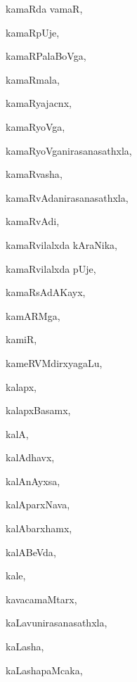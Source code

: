\begin{multicols}{3}
{\noindent
{kamaRda vamaR}, \pageref{kamaRda vamaR}

\noindent
{kamaRpUje}, \pageref{kamaRpUje}

\noindent
{kamaRPalaBoVga}, \pageref{kamaRPalaBoVga}

\noindent
{kamaRmala}, \pageref{kamaRmala}

\noindent
{kamaRyajacnx}, \pageref{kamaRyajacnx}

\noindent
{kamaRyoVga}, \pageref{kamaRyoVga}

\noindent
{kamaRyoVganirasanasathxla}, \pageref{kamaRyoVganirasanasathxla}

\noindent
{kamaRvasha}, \pageref{kamaRvasha}

\noindent
{kamaRvAdanirasanasathxla}, \pageref{kamaRvAdanirasanasathxla}

\noindent
{kamaRvAdi}, \pageref{kamaRvAdi}

\noindent
{kamaRvilalxda kAraNika}, \pageref{kamaRvilalxda kAraNika}

\noindent
{kamaRvilalxda pUje}, \pageref{kamaRvilalxda pUje}

\noindent
{kamaRsAdAKayx}, \pageref{kamaRsAdAKayx}

\noindent
{kamARMga}, \pageref{kamARMga}

\noindent
{kamiR}, \pageref{kamiR}

\noindent
{kameRVMdirxyagaLu}, \pageref{kameRVMdirxyagaLu}

\noindent
{kalapx}, \pageref{kalapx}

\noindent
{kalapxBasamx}, \pageref{kalapxBasamx}

\noindent
{kalA}, \pageref{kalA}

\noindent
{kalAdhavx}, \pageref{kalAdhavx}

\noindent
{kalAnAyxsa}, \pageref{kalAnAyxsa}

\noindent
{kalAparxNava}, \pageref{kalAparxNava}

\noindent
{kalAbarxhamx}, \pageref{kalAbarxhamx}

\noindent
{kalABeVda}, \pageref{kalABeVda}

\noindent
{kale}, \pageref{kale}

\noindent
{kavacamaMtarx}, \pageref{kavacamaMtarx}

\noindent
{kaLavunirasanasathxla}, \pageref{kaLavunirasanasathxla}

\noindent
{kaLasha}, \pageref{kaLasha}

\noindent
{kaLashapaMcaka}, \pageref{kaLashapaMcaka}

}
\end{multicols}
